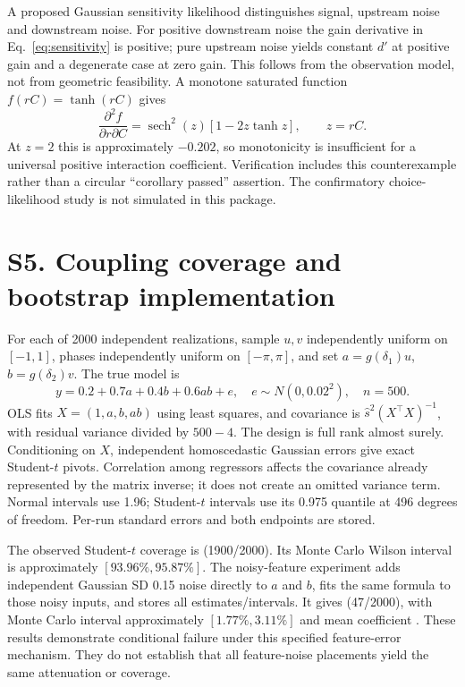 \documentclass[11pt,a4paper]{article}
\begin{document}
A proposed Gaussian sensitivity likelihood distinguishes signal, upstream noise and downstream noise. For positive downstream noise the gain derivative in Eq.~\ref{eq:sensitivity} is positive; pure upstream noise yields constant $d'$ at positive gain and a degenerate case at zero gain. This follows from the observation model, not from geometric feasibility. A monotone saturated function $f(rC)=\tanh(rC)$ gives
\[
 \frac{\partial^2 f}{\partial r\partial C}
 =\operatorname{sech}^2(z)[1-2z\tanh z],\qquad z=rC.
\]
At $z=2$ this is approximately $-0.202$, so monotonicity is insufficient for a universal positive interaction coefficient. Verification includes this counterexample rather than a circular ``corollary passed'' assertion. The confirmatory choice-likelihood study is not simulated in this package.

\section*{S5. Coupling coverage and bootstrap implementation}
For each of 2000 independent realizations, sample $u,v$ independently uniform on $[-1,1]$, phases independently uniform on $[-\pi,\pi]$, and set $a=g(\delta_1)u$, $b=g(\delta_2)v$. The true model is
\[
 y=0.2+0.7a+0.4b+0.6ab+e,\quad e\sim N(0,0.02^2),\quad n=500.
\]
OLS fits $X=(1,a,b,ab)$ using least squares, and covariance is $\widehat s^2(X^\top X)^{-1}$, with residual variance divided by $500-4$. The design is full rank almost surely. Conditioning on $X$, independent homoscedastic Gaussian errors give exact Student-$t$ pivots. Correlation among regressors affects the covariance already represented by the matrix inverse; it does not create an omitted variance term. Normal intervals use 1.96; Student-$t$ intervals use its 0.975 quantile at 496 degrees of freedom. Per-run standard errors and both endpoints are stored.

The observed Student-$t$ coverage is \TCoverage{} (1900/2000). Its Monte Carlo Wilson interval is approximately $[93.96\%,95.87\%]$. The noisy-feature experiment adds independent Gaussian SD 0.15 noise directly to $a$ and $b$, fits the same formula to those noisy inputs, and stores all estimates/intervals. It gives \NoisyCoverage{} (47/2000), with Monte Carlo interval approximately $[1.77\%,3.11\%]$ and mean coefficient \NoisyChi{}. These results demonstrate conditional failure under this specified feature-error mechanism. They do not establish that all feature-noise placements yield the same attenuation or coverage.
\end{document}
